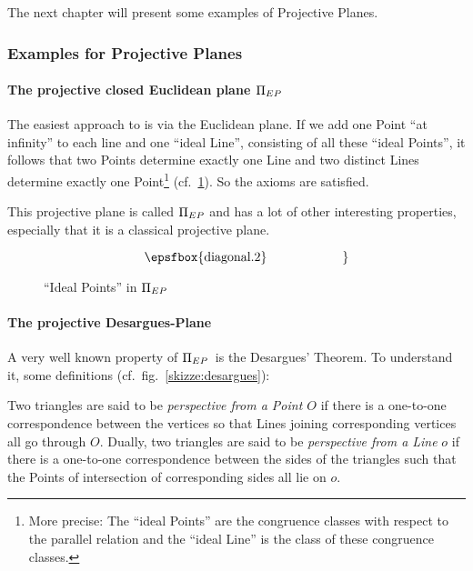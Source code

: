 The next chapter will present some examples of Projective Planes.


%
\subsubsection{Examples for Projective Planes%
\label{:projective:examples}}

%
%
\paragraph{The projective closed Euclidean plane $\Pi_{EP}$%
\label{:projective:examples:piae}}
The easiest approach to  \pg is via the Euclidean plane. If we add
one Point ``at infinity'' to each line and one ``ideal Line'',
consisting of all these ``ideal Points'', it follows that two
Points determine exactly one Line and two distinct Lines determine
exactly one Point\footnote{More precise: The ``ideal Points'' are the
congruence classes with respect to the parallel relation and the
``ideal Line'' is the class of these congruence classes.} 
(cf.~\ref{skizze:piae}).
So the axioms are satisfied.

This projective plane is called $\Pi_{EP}$ and has a lot of other
interesting properties, especially that it is a classical projective
plane.

\begin{figure}[ht] \[
   \left.\hbox to 6cm{$\vcenter{\epsfbox{diagonal.2}}$}\right\}\]
  \caption{``Ideal Points'' in $\Pi_{EP}$\label{skizze:piae}}
\end{figure}

\paragraph{The projective Desargues-Plane%
\label{:projective:examples:desargues}}
A very well known property of $\Pi_{EP}$\ is the Desargues' Theorem. To
understand it, some definitions (cf.~fig.~\ref{skizze:desargues}):

\begin{definition} Two triangles are said to be \emph{perspective from
a Point $O$} if there is a one-to-one correspondence between the
vertices so that Lines joining corresponding vertices all go through
$O$. Dually, two triangles are said to be \emph{perspective from a
Line} $o$ if there is a one-to-one correspondence between the sides of
the triangles such that the Points of intersection of corresponding
sides all lie on $o$.
\end{definition}


